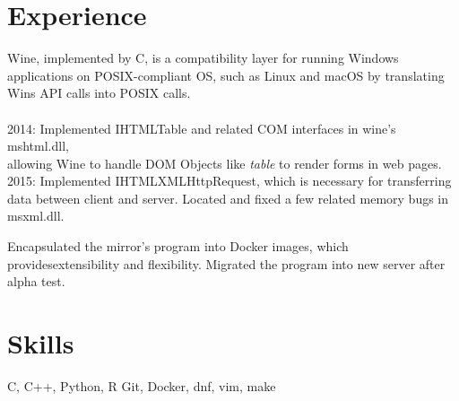 

\section{Experience}

{
	{Wine, implemented by C, is a compatibility layer for running Windows applications on %
	POSIX-compliant OS, such as Linux and macOS by translating Wins API %
	calls into POSIX calls.\\ \\}
	{2014: Implemented IHTMLTable and related COM interfaces in wine's mshtml.dll,\\
		\phantom{2014: }allowing Wine to handle DOM Objects like \textit{table} to render forms in web pages.}\\
	{2015: Implemented IHTMLXMLHttpRequest, which is necessary for transferring data between
		\phantom{2015: }client and server. Located and fixed a few related memory bugs in msxml.dll.}
}





{
Encapsulated the mirror's program into Docker images, which providesextensibility
and flexibility. Migrated the program into new server after alpha test.
}

\vspace{-5mm}

\section{Skills}
{ C, C++, Python, R
	}
{Git, Docker, dnf, vim, make
	}
%




